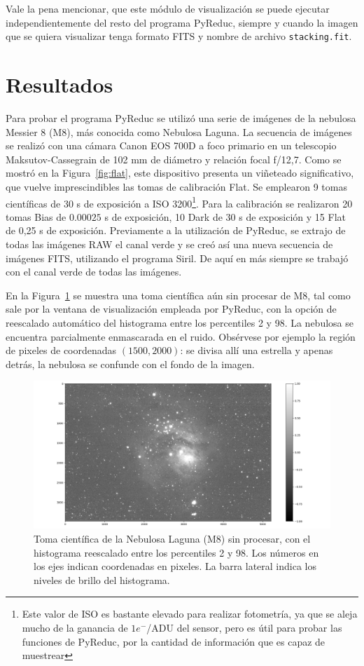 \documentclass[a4paper, 12pt]{article}
\begin{document}
Vale la pena mencionar, que este módulo de visualización se puede ejecutar independientemente del resto del programa PyReduc, siempre y cuando la imagen que se quiera visualizar tenga formato FITS y nombre de archivo \texttt{stacking.fit}.

 
\section{Resultados}
Para probar el programa PyReduc se utilizó una serie de imágenes de la nebulosa Messier 8 (M8), más conocida como Nebulosa Laguna. La secuencia de imágenes se realizó con una cámara {\sf Canon EOS 700D} a foco primario en un telescopio Maksutov-Cassegrain de 102 mm de diámetro y relación focal f/12,7. Como se mostró en la Figura~\ref{fig:flat}, este dispositivo presenta un viñeteado significativo, que vuelve imprescindibles las tomas de calibración Flat. Se emplearon 9 tomas científicas de 30 s de exposición a ISO 3200\footnote{Este valor de ISO es bastante elevado para realizar fotometría, ya que se aleja mucho de la ganancia de $1 e^{-}$/ADU del sensor, pero es útil para probar las funciones de PyReduc, por la cantidad de información que es capaz de muestrear}. Para la calibración se realizaron 20 tomas Bias de $0.00025$ s de exposición, 10 Dark de 30 s de exposición y 15 Flat de 0,25 s de exposición. Previamente a la utilización de PyReduc, se extrajo de todas las imágenes RAW el canal verde y se creó así una nueva secuencia de imágenes FITS, utilizando el programa {\sf Siril}. De aquí en más siempre se trabajó con el canal verde de todas las imágenes.

En la Figura~\ref{fig:laguna0} se muestra una toma científica aún sin procesar de M8, tal como sale por la ventana de visualización empleada por PyReduc, con la opción de reescalado automático del histograma entre los percentiles 2 y 98. La nebulosa se encuentra parcialmente enmascarada en el ruido. Obsérvese por ejemplo la región de pixeles de coordenadas $(1500, 2000)$: se divisa allí una estrella y apenas detrás, la nebulosa se confunde con el fondo de la imagen.

\begin{figure}[!h]
  \centering
  \includegraphics[width=\textwidth]{img/sin_proc.png}
  \caption{\label{fig:laguna0} Toma científica de la Nebulosa Laguna (M8) sin procesar, con el histograma reescalado entre los percentiles 2 y 98. Los números en los ejes indican coordenadas en pixeles. La barra lateral indica los niveles de brillo del histograma.}
\end{figure}
\end{document}
